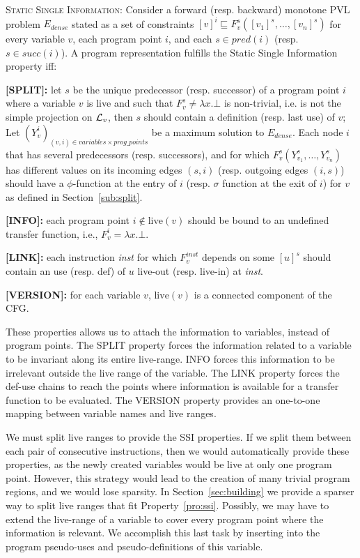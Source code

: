 \begin{property}[SSI]
\label{pro:ssi}\textsc{Static Single Information:} Consider a forward (resp. backward) monotone PVL problem $E_{dense}$ stated as a set of constraints $[v]^i \sqsubseteq F_v^s([v_1]^s,\dots,[v_n]^s)$ for every variable $v$, each program point $i$, and each $s \in \mathit{pred}(i)$ (resp. $s\in \mathit{succ}(i)$).
A program representation fulfills the Static Single Information property iff:\begin{description}
\item {\bf [SPLIT]:} let $s$ be the unique predecessor (resp. successor) of a program point $i$ where a variable $v$ is live and such that $F_v^s\neq \lambda x.\bot$ is non-trivial, i.e. is not the simple projection on ${\cal L}_v$, then $s$ should contain a definition (resp. last use) of $v$; 
Let $(Y_v^i)_{(v,i)\in variables\times prog\_points}$ be a maximum solution to $E_{dense}$. 
Each node $i$ that has several predecessors (resp. successors), and for which $F_v^s(Y_{v_1}^s,\dots,Y_{v_n}^s)$ has different values on its incoming edges $(s,i)$ (resp. outgoing edges $(i,s)$) should have a $\phi$-function at the entry of $i$ (resp. $\sigma$ function at the exit of $i$) for $v$
as defined in Section~\ref{sub:split}.
\item {\bf [INFO]:} each program point $i\not\in \textrm{live}(v)$ should be bound to an undefined  transfer function, i.e., $F_v^i=\lambda x.\bot$.
\item {\bf [LINK]:} each instruction {\em inst} for which $F_v^{inst}$ depends on some $[u]^s$ should contain an use (resp. def) of $u$ live-out (resp. live-in) at
{\em inst}.
\item {\bf [VERSION]:} for each variable $v$, $\textrm{live}(v)$ is a connected component of the CFG.
\end{description}
\end{property}

These properties allows us to attach the information to variables, instead of program points.
The {SPLIT} property forces the information related to a variable to be invariant along its entire live-range.
{INFO} forces this information to be irrelevant outside the live range of the variable.
The {LINK} property forces the def-use chains to reach the points where information is available for a transfer function to be evaluated.
The {VERSION} property provides an one-to-one mapping between variable names and live ranges.

We must split live ranges to provide the SSI properties.
If we split them between each pair of consecutive instructions, then we would automatically provide these properties, as the newly created variables
would be live at only one program point.
However, this strategy would lead to the creation of many trivial program regions, and we would lose sparsity.
In Section~\ref{sec:building} we provide a sparser way to split live ranges that fit Property~\ref{pro:ssi}.
Possibly, we may have to extend the live-range of a variable to cover every program point where the information is relevant.
We accomplish this last task by inserting into the program pseudo-uses and pseudo-definitions of this variable.

